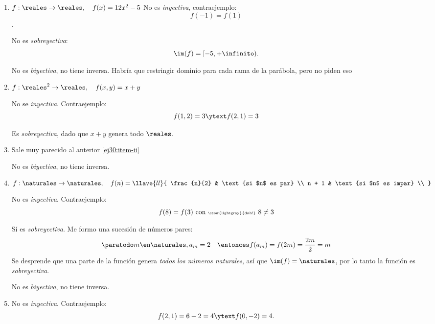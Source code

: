 \begin{enumerate}[label=\roman*)]
  \item
        $f: \reales \to \reales,\quad f(x) = 12 x^2 - 5$
        No es \textit{inyectiva}, contraejemplo:
        $$
          f(-1) = f(1)
        $$.

        No es \textit{sobreyectiva}:
        $$
          \im(f) = [-5, +\infinito).
        $$

        No es \textit{biyectiva}, no tiene inversa. Habría que restringir dominio para cada rama de la parábola, pero no piden eso 

  \item\label{ej30:item-ii}
        $f: \reales^2 \to \reales,\quad f(x,y) = x + y$

        No se \textit{inyectiva}. Contraejemplo:
        $$
          f(1,2) = 3 \ytext f(2,1) = 3
        $$

        Es \textit{sobreyectiva}, dado que $x + y$ genera todo $\reales$.

  \item Sale muy parecido al anterior \ref{ej30:item-ii}

        No es \textit{biyectiva}, no tiene inversa.

  \item $f: \naturales \to \naturales,\quad
          f(n) =
          \llave{ll}{
            \frac{n}{2} & \text{si $n$ es par}   \\
            n + 1       & \text{si $n$ es impar} \\
          }$\par

        No es \textit{inyectiva}. Contraejemplo:
        $$
          f(8) = f(3) \text{ con {\tiny \color{lightgray}{dah!}} } 8 \neq 3
        $$

        Sí es \textit{sobreyectiva}. Me formo una sucesión de números pares:
        $$
          \paratodo m \en \naturales, a_m = 2
          \quad\entonces
          f(a_m) = f(2m) = \frac{2m}{2} = m
        $$
        Se desprende que una parte de la función genera \textit{todos los números naturales},
        así que $\im(f) = \naturales$, por lo tanto la función es \textit{sobreyectiva}.

        No es \textit{biyectiva}, no tiene inversa.

  \item No es \textit{inyectiva}. Contraejemplo:
        $$
          f(2,1) = 6 - 2 = 4 \ytext f(0,-2) = 4.
        $$


\end{enumerate}
